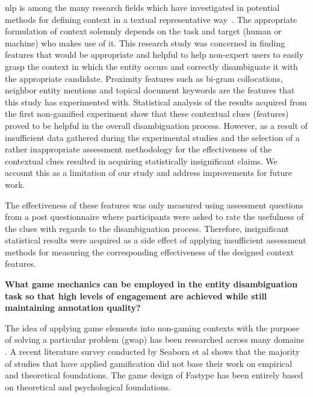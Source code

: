 \ac{nlp} is among the many research fields which have investigated in potential methods for defining context in a textual representative way~\cite{22}. The appropriate formulation of context solemnly depends on the task and target (human or machine) who makes use of it. This research study was concerned in finding features that would be appropriate and helpful to help non-expert users to easily grasp the context in which the entity occurs and correctly disambiguate it with the appropriate candidate. Proximity features such as bi-gram collocations, neighbor entity mentions and topical document keywords are the features that this study has experimented with. Statistical analysis of the results acquired from the first non-gamified experiment show that these contextual clues (features) proved to be helpful in the overall disambiguation process. However, as a result of insufficient data gathered during the experimental studies and the selection of a rather inappropriate assessment methodology for the effectiveness of the contextual clues resulted in acquiring statistically insignificant claims. We account this as a limitation of our study and address improvements for future work.\hfill \break

\if The effectiveness of these features was only measured using assessment questions from a post questionnaire where participants were asked to rate the usefulness of the clues with regards to the disambiguation process. Therefore, insignificant statistical results were acquired as a side effect of applying insufficient assessment methods for measuring the corresponding effectiveness of the designed context features.\fi


\textbf{What game mechanics can be employed in the entity disambiguation task so that high levels of engagement are achieved while still maintaining annotation quality?}  \hfill \break

The idea of applying game elements into non-gaming contexts with the purpose of solving a particular problem (\ac{gwap}) has been researched across many domains \cite{47}. A recent literature survey conducted by Seaborn et al \cite{45} shows that the majority of studies that have applied gamification did not base their work on empirical and theoretical foundations. The game design of Fastype has been entirely based on theoretical and psychological foundations. 

